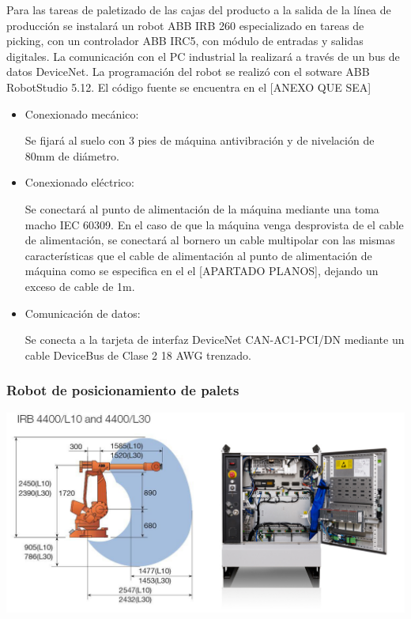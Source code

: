 	Para las tareas de paletizado de las cajas del producto a la salida de la línea de producción se instalará un robot ABB IRB 260 especializado en tareas de picking, con un controlador ABB IRC5, con módulo de entradas y salidas digitales. La comunicación con el PC industrial la realizará a través de un bus de datos DeviceNet. La programación del robot se realizó con el sotware ABB RobotStudio 5.12. El código fuente se encuentra en el [ANEXO QUE SEA]\\
	
		\begin{itemize}
				\item{Conexionado mecánico:}
				
				Se fijará al suelo con 3 pies de máquina antivibración y de nivelación de 80mm de diámetro.

				\item{Conexionado eléctrico:}

				Se conectará al punto de alimentación de la máquina mediante una  toma macho IEC 60309. En el caso de que la máquina venga desprovista de el cable de alimentación, se conectará al bornero un cable multipolar con las mismas características que el cable de alimentación al punto de alimentación de máquina como se especifica en el el [APARTADO PLANOS], dejando un exceso de cable de 1m. \	
							
				\item{Comunicación de datos:}

				Se conecta a la tarjeta de interfaz DeviceNet CAN-AC1-PCI/DN mediante un cable DeviceBus de Clase 2 18 AWG trenzado.
		\end{itemize}
\newpage

	\subsubsection{Robot de posicionamiento de palets}

	\includegraphics[scale=0.4]{Datasheets/9Foto.jpg}
	
